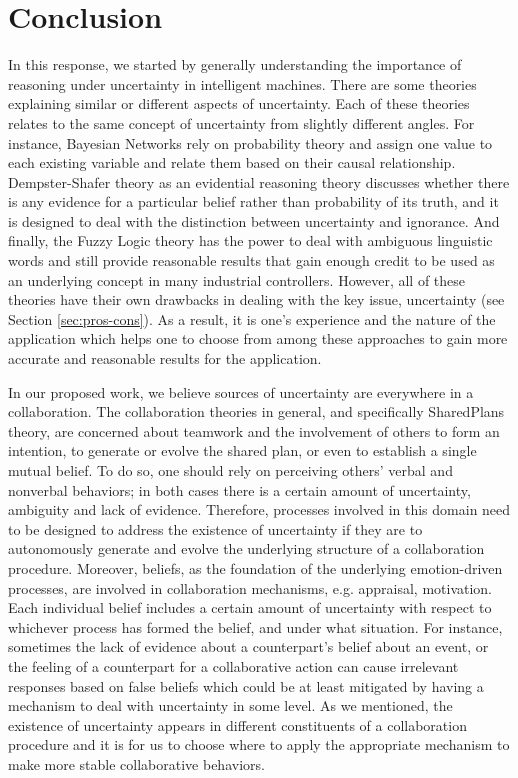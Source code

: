 \documentclass[11pt]{article}
\begin{document}
\section{Conclusion}
\label{sec:conclusion}

In this response, we started by generally understanding the importance of
reasoning under uncertainty in intelligent machines. There are some theories
explaining similar or different aspects of uncertainty. Each of these theories
relates to the same concept of uncertainty from slightly different angles. For
instance, Bayesian Networks rely on probability theory and assign one value
to each existing variable and relate them based on their causal relationship.
Dempster-Shafer theory as an evidential reasoning theory discusses whether there
is any evidence for a particular belief rather than probability of its truth,
and it is designed to deal with the distinction between uncertainty and ignorance.
And finally, the Fuzzy Logic theory has the power to deal with ambiguous
linguistic words and still provide reasonable results that gain enough credit
to be used as an underlying concept in many industrial controllers. However, all
of these theories have their own drawbacks in dealing with the key issue,
uncertainty (see Section \ref{sec:pros-cons}). As a result, it is one's
experience and the nature of the application which helps one to choose from
among these approaches to gain more accurate and reasonable results for the
application.

In our proposed work, we believe sources of uncertainty are everywhere in a
collaboration. The collaboration theories in general, and specifically
SharedPlans theory, are concerned about teamwork and the involvement of others
to form an intention, to generate or evolve the shared plan, or even to establish a
single mutual belief. To do so, one should rely on perceiving others' verbal and
nonverbal behaviors; in both cases there is a certain amount of uncertainty,
ambiguity and lack of evidence. Therefore, processes involved in this domain
need to be designed to address the existence of uncertainty if they are to 
autonomously generate and evolve the underlying structure of a collaboration
procedure. Moreover, beliefs, as the foundation of the underlying emotion-driven
processes, are involved in collaboration mechanisms, e.g. appraisal,
motivation.
Each individual belief includes a certain amount of uncertainty with respect to
whichever process has formed the belief, and under what situation. For instance,
sometimes the lack of evidence about a counterpart's belief about an event, or
the feeling of a counterpart for a collaborative action can cause irrelevant
responses based on false beliefs which could be at least mitigated by having a
mechanism to deal with uncertainty in some level. As we mentioned, the existence
of uncertainty appears in different constituents of a collaboration procedure
and it is for us to choose where to apply the appropriate mechanism to make more
stable collaborative behaviors.



\end{document}
